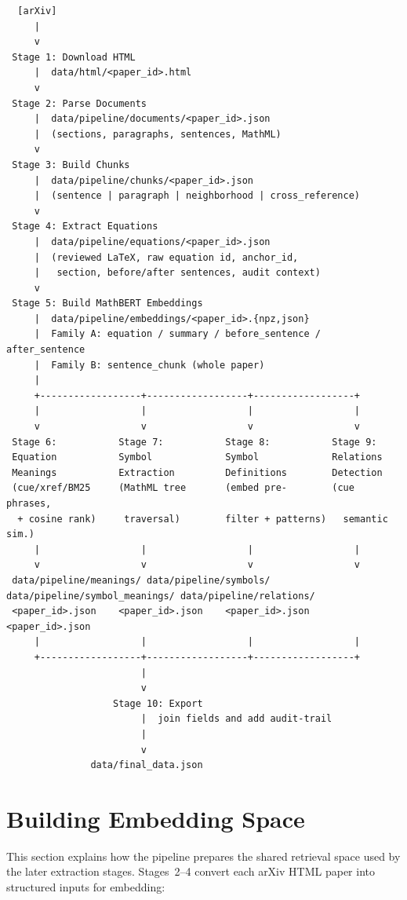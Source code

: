 \documentclass[11pt]{article}
\begin{document}
\begingroup
\scriptsize
\begin{verbatim}
  [arXiv]
     |
     v
 Stage 1: Download HTML
     |  data/html/<paper_id>.html
     v
 Stage 2: Parse Documents
     |  data/pipeline/documents/<paper_id>.json
     |  (sections, paragraphs, sentences, MathML)
     v
 Stage 3: Build Chunks
     |  data/pipeline/chunks/<paper_id>.json
     |  (sentence | paragraph | neighborhood | cross_reference)
     v
 Stage 4: Extract Equations
     |  data/pipeline/equations/<paper_id>.json
     |  (reviewed LaTeX, raw equation id, anchor_id,
     |   section, before/after sentences, audit context)
     v
 Stage 5: Build MathBERT Embeddings
     |  data/pipeline/embeddings/<paper_id>.{npz,json}
     |  Family A: equation / summary / before_sentence / after_sentence
     |  Family B: sentence_chunk (whole paper)
     |
     +------------------+------------------+------------------+
     |                  |                  |                  |
     v                  v                  v                  v
 Stage 6:           Stage 7:           Stage 8:           Stage 9:
 Equation           Symbol             Symbol             Relations
 Meanings           Extraction         Definitions        Detection
 (cue/xref/BM25     (MathML tree       (embed pre-        (cue phrases,
  + cosine rank)     traversal)        filter + patterns)   semantic sim.)
     |                  |                  |                  |
     v                  v                  v                  v
 data/pipeline/meanings/ data/pipeline/symbols/  data/pipeline/symbol_meanings/ data/pipeline/relations/
 <paper_id>.json    <paper_id>.json    <paper_id>.json    <paper_id>.json
     |                  |                  |                  |
     +------------------+------------------+------------------+
                        |
                        v
                   Stage 10: Export
                        |  join fields and add audit-trail
                        |
                        v
               data/final_data.json
\end{verbatim}
\endgroup
\clearpage

\section{Building Embedding Space}

This section explains how the pipeline prepares the shared retrieval
space used by the later extraction stages.
Stages~2--4 convert each arXiv HTML paper into structured inputs for
embedding:
\end{document}
